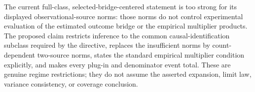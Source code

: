The current full-class, selected-bridge-centered statement is too strong for its displayed observational-source norms: those norms do not control experimental evaluation of the estimated outcome bridge or the empirical multiplier products.  The proposed claim restricts inference to the common causal-identification subclass required by the directive, replaces the insufficient norms by count-dependent two-source norms, states the standard empirical multiplier condition explicitly, and makes every plug-in and denominator event total.  These are genuine regime restrictions; they do not assume the asserted expansion, limit law, variance consistency, or coverage conclusion.